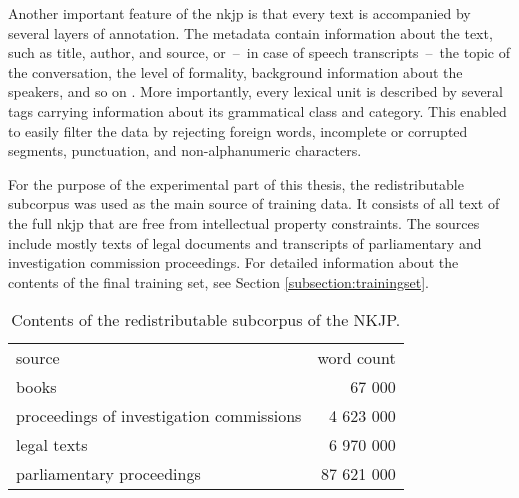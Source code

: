 Another important feature of the \gls{nkjp} is that every text is accompanied by several layers of annotation. The metadata contain information about the text, such as title, author, and source, or~--~in case of speech transcripts~--~the topic of the conversation, the level of formality, background information about the speakers, and so on \cite{przepiorkowski2009xml}. More importantly, every lexical unit is described by several tags carrying information about its grammatical class and category. This enabled to easily filter the data by rejecting foreign words, incomplete or corrupted segments, punctuation, and \mbox{non-alphanumeric} characters. 

For the purpose of the experimental part of this thesis, the redistributable subcorpus was used as the main source of training data. It consists of all text of the full \gls{nkjp} that are free from intellectual property constraints. The sources include mostly texts of legal documents and transcripts of parliamentary and investigation commission proceedings. For detailed information about the contents of the final training set, see Section \ref{subsection:trainingset}.

\begin{table}[h!]
  \begin{center}
	  \caption[Contents of the redistributable subcorpus of the NKJP]{Contents of the redistributable subcorpus of the NKJP.}
	    \label{table:freenkjp}
	    \begin{tabular*}{.6\linewidth}{@{\extracolsep{\fill}}lr}
      source & word count \\
      \cmidrule{1-2}
      books & 67 000\\
      proceedings of investigation commissions & 4 623 000\\
      legal texts & 6 970 000\\
      parliamentary proceedings & 87 621 000\\
    \end{tabular*}
  \end{center}
\end{table}

